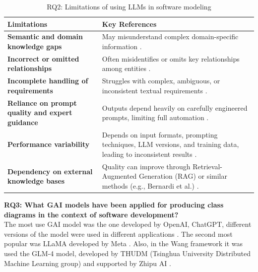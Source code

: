 \begin{table}[htb]
  \centering
  \small
  \renewcommand{\arraystretch}{0.9} %
  \setlength{\tabcolsep}{4pt}
  \begin{tabular}{p{5cm}p{8.5cm}}
  \toprule
  \textbf{Limitations} & \textbf{Key References} \\
  \midrule
  \textbf{Semantic and domain knowledge gaps} & 
  May misunderstand complex domain-specific information 
  \cite{5ferrari2024,11omar2023,1deBari2024,8z_wang2024}. \\[6pt]
  \midrule
  \textbf{Incorrect or omitted relationships} & 
  Often misidentifies or omits key relationships among entities 
  \cite{2babaalla2024,6wang2024,4jahan2024,14chaaben2023}. \\[6pt]
  \midrule
  \textbf{Incomplete handling of requirements} & 
  Struggles with complex, ambiguous, or inconsistent textual requirements 
  \cite{5ferrari2024,7eisenreich2024,9ruan2023,14chaaben2023}. \\[6pt]
  \midrule
  \textbf{Reliance on prompt quality and expert guidance} & 
  Outputs depend heavily on carefully engineered prompts, limiting full automation 
  \cite{6wang2024,13benardi2024}. \\[6pt]
  \midrule
  \textbf{Performance variability} & 
  Depends on input formats, prompting techniques, LLM versions, and training data, leading to inconsistent results 
  \cite{14chaaben2023,2babaalla2024,3ahmad2023,15Naimi}. \\[6pt]
  \midrule
  \textbf{Dependency on external knowledge bases} & 
  Quality can improve through Retrieval-Augmented Generation (RAG) or similar methods (e.g., Bernardi et al.) 
  \cite{13benardi2024}. \\
  \bottomrule
  \end{tabular}
  \label{tab:llm_limitations}
  \caption{RQ2: Limitations of using LLMs in software modeling}
\end{table}


\textbf{RQ3: What GAI models have been applied for producing class diagrams  in the context of software development?}\\

The most use GAI model was the one developed by OpenAI, ChatGPT, different versions of the model were used in different applications \cite{openai2025}. The second most popular was LLaMA developed by Meta \cite{llama2025}. Also, in the Wang framework \cite{8z_wang2024} it was used the GLM-4 model, developed by THUDM (Tsinghua University Distributed Machine Learning group) and supported by Zhipu AI \cite{glm2024chatglmfamilylargelanguage}.

